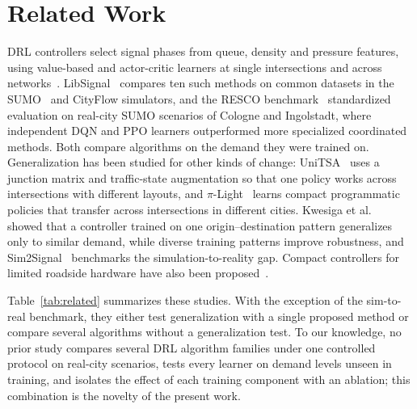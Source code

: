 \section{Related Work}
\label{sec:related}

DRL controllers select signal phases from queue, density and pressure features, using value-based and actor-critic learners at single intersections and across networks~\cite{michailidis2025review}. LibSignal~\cite{mei2024libsignal} compares ten such methods on common datasets in the SUMO~\cite{lopez2018sumo} and CityFlow simulators, and the RESCO benchmark~\cite{ault2021resco} standardized evaluation on real-city SUMO scenarios of Cologne and Ingolstadt, where independent DQN and PPO learners outperformed more specialized coordinated methods. Both compare algorithms on the demand they were trained on. Generalization has been studied for other kinds of change: UniTSA~\cite{wang2024unitsa} uses a junction matrix and traffic-state augmentation so that one policy works across intersections with different layouts, and $\pi$-Light~\cite{gu2024pilight} learns compact programmatic policies that transfer across intersections in different cities. Kwesiga et al.~\cite{kwesiga2026robustness} showed that a controller trained on one origin--destination pattern generalizes only to similar demand, while diverse training patterns improve robustness, and Sim2Signal~\cite{rafi2026sim2signal} benchmarks the simulation-to-reality gap. Compact controllers for limited roadside hardware have also been proposed~\cite{xing2022tinylight,gu2024pilight}.

Table~\ref{tab:related} summarizes these studies. With the exception of the sim-to-real benchmark, they either test generalization with a single proposed method or compare several algorithms without a generalization test. To our knowledge, no prior study compares several DRL algorithm families under one controlled protocol on real-city scenarios, tests every learner on demand levels unseen in training, and isolates the effect of each training component with an ablation; this combination is the novelty of the present work.


